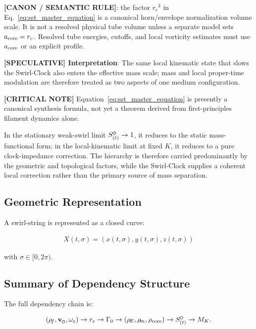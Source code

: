 \documentclass[11pt]{article}
\theoremstyle{definition}
\theoremstyle{plain}
\theoremstyle{remark}
\newcommand{\swirlarrow}{\mathchoice{\mkern-2mu\scriptstyle\boldsymbol{\circlearrowleft}}{\mkern-2mu\scriptstyle\boldsymbol{\circlearrowleft}}{\mkern-2mu\scriptscriptstyle\boldsymbol{\circlearrowleft}}{\mkern-2mu\scriptscriptstyle\boldsymbol{\circlearrowleft}}}
\newcommand{\vswirl}{\mathbf{v}_{\swirlarrow}}
\newcommand{\rhoF}{{\rho_{\!f}}}
\newcommand{\rhoE}{\rho_{\!E}}
\newcommand{\rhoM}{\rho_{\!m}}
\newcommand{\rhocore}{\rho_{\mathrm{core}}}
\newcommand{\SwirlClock}{{S_{(t)}^{\swirlarrow}}}
\newcommand{\rc}{{r_c}}
\begin{document}
        \textbf{[CANON / SEMANTIC RULE]}: the factor \(\rc^3\) in Eq.~\eqref{eq:sst_master_equation} is a canonical horn/envelope normalization volume scale. It is not a resolved physical tube volume unless a separate model sets \(a_{\rm core}=\rc\). Resolved tube energies, cutoffs, and local vorticity estimates must use \(a_{\rm core}\) or an explicit profile.

        \textbf{[SPECULATIVE] Interpretation}: The same local kinematic state that slows the Swirl-Clock also enters the effective mass scale; mass and local proper-time modulation are therefore treated as two aspects of one medium configuration.

        \textbf{[CRITICAL NOTE]} Equation~\eqref{eq:sst_master_equation} is presently a canonical synthesis formula, not yet a theorem derived from first-principles filament dynamics alone.

        In the stationary weak-swirl limit $\SwirlClock \to 1$, it reduces to the static mass-functional form; in the local-kinematic limit at fixed $K$, it reduces to a pure clock-impedance correction. The hierarchy is therefore carried predominantly by the geometric and topological factors, while the Swirl-Clock supplies a coherent local correction rather than the primary source of mass separation.

    \subsection{Geometric Representation}
        
        A swirl-string is represented as a closed curve:
        
        \begin{align}
            X(t,\sigma) = (x(t,\sigma), y(t,\sigma), z(t,\sigma))
        \end{align}
        
        with $\sigma \in [0,2\pi)$.
    
    \subsection{Summary of Dependency Structure}
        
        The full dependency chain is:
        
        \begin{align}
        (\rhoF, \vswirl, \omega_c)
            \rightarrow \rc
            \rightarrow \Gamma_0
            \rightarrow (\rhoE, \rhoM, \rhocore)
            \rightarrow \SwirlClock
            \rightarrow M_K.
        \end{align}
        
\end{document}
